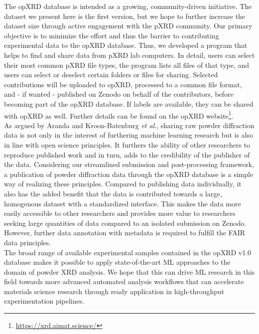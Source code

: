 The opXRD database is intended as a growing, community-driven initiative. The dataset we present here is the first version, but we hope to further increase the dataset size through active engagement with the pXRD community. Our primary objective is to minimize the effort and thus the barrier to contributing experimental data to the opXRD database. Thus, we developed a program that helps to find and share data from pXRD lab computers. In detail, users can select their most common pXRD file types, the program lists all files of that type, and users can select or deselect certain folders or files for sharing. Selected contributions will be uploaded to opXRD, processed to a common file format, and - if wanted - published on Zenodo on behalf of the contributors, before becoming part of the opXRD database. If labels are available, they can be shared with opXRD as well. Further details can be found on the opXRD website\footnote{\url{https://xrd.aimat.science/}}. \\

As argued by Aranda and Kroon-Batenburg \textit{et al}.\cite{Aranda2018, Kroon-Batenburg2024}, sharing raw powder diffraction data is not only in the interest of furthering machine learning research but is also in line with open science principles. It furthers the ability of other researchers to reproduce published work and in turn, adds to the credibility of the publisher of the data. Considering our streamlined submission and post-processing framework, a publication of powder diffraction data through the opXRD database is a simple way of realizing these principles. Compared to publishing data individually, it also has the added benefit that the data is contributed towards a large, homogenous dataset with a standardized interface. This makes the data more easily accessible to other researchers and provides more value to researchers seeking large quantities of data compared to an isolated submission on Zenodo. However, further data annotation with metadata is required to fulfill the FAIR data principles.\\

The broad range of available experimental samples contained in the opXRD v1.0 database makes it possible to apply state-of-the-art ML approaches to the domain of powder XRD analysis. We hope that this can drive ML research in this field towards more advanced automated analysis workflows that can accelerate materials science research through ready application in high-throughput experimentation pipelines.